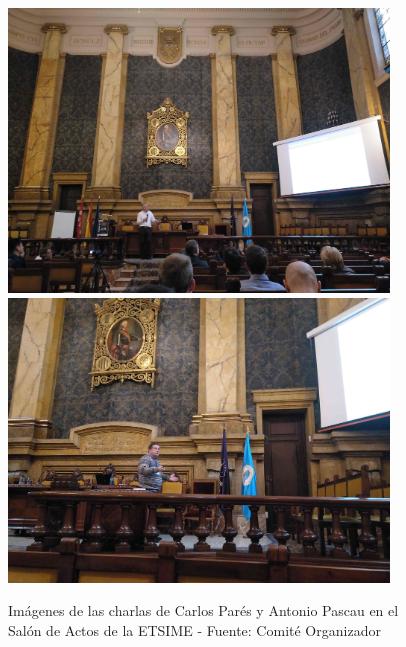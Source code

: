 \documentclass[twoside]{article}
\begin{document}
\begin{center}
\begin{figure}
	\centering
		\includegraphics[width=0.9\textwidth]{CPares}
		\includegraphics[width=0.9\textwidth]{APascau}
	\label{fig:Salon3}
	\caption{Imágenes de las charlas de Carlos Parés y Antonio Pascau en el Salón de Actos de la ETSIME  - Fuente: Comité Organizador}
\end{figure}
\end{center}
%
\end{document}
